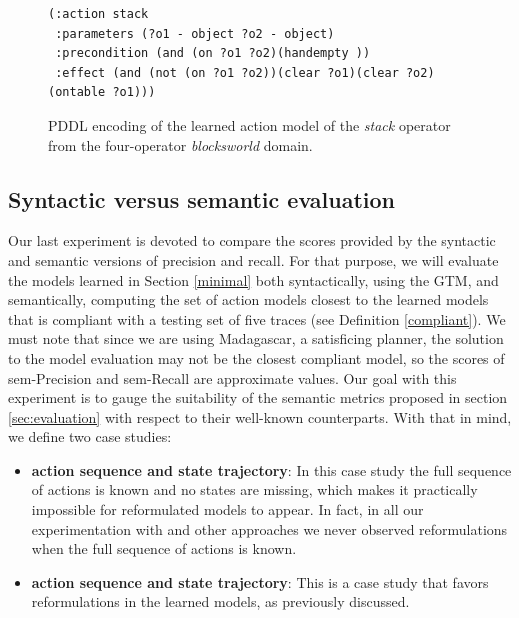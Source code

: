 \begin{figure}[hbt!]
	\begin{footnotesize}
		\begin{verbatim}
(:action stack
 :parameters (?o1 - object ?o2 - object)
 :precondition (and (on ?o1 ?o2)(handempty ))
 :effect (and (not (on ?o1 ?o2))(clear ?o1)(clear ?o2)(ontable ?o1)))
		\end{verbatim}
	\end{footnotesize}
	\caption{PDDL encoding of the learned action model of the {\em stack} operator from the four-operator {\em blocksworld} domain.}
	\label{fig:macroaction}
\end{figure}



\subsection{Syntactic versus semantic evaluation}

Our last experiment is devoted to compare the scores provided by the syntactic and semantic versions of precision and recall. For that purpose, we will evaluate the models learned in Section \ref{minimal} both syntactically, using the GTM, and semantically, computing the set of action models closest to the learned models that is compliant with a testing set of five traces (see Definition \ref{compliant}). We must note that since we are using {\sc Madagascar}, a satisficing planner, the solution to the model evaluation may not be the closest compliant model, so the scores of sem-Precision and sem-Recall are approximate values. Our goal with this experiment is to gauge the suitability of the semantic metrics proposed in section \ref{sec:evaluation} with respect to their well-known counterparts. With that in mind, we define two case studies:

\begin{itemize}
	\item \textbf{\FO action sequence and \PO state trajectory}: In this case study the full sequence of actions is known and no states are missing, which makes it practically impossible for reformulated models to appear. In fact, in all our experimentation with \FAMA and other approaches we never observed reformulations when the full sequence of actions is known.
	\item  \textbf{\NO action sequence and \NO state trajectory}: This is a case study that favors reformulations in the learned models, as previously discussed.
\end{itemize}

